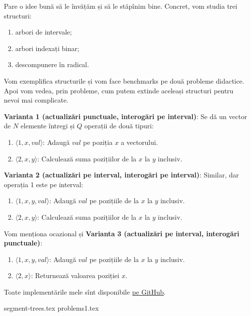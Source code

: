 Pare o idee bună să le învățăm și să le stăpînim bine.  Concret, vom studia trei structuri:

\begin{enumerate}
  \item arbori de intervale;
  \item arbori indexați binar;
  \item descompunere în radical.
\end{enumerate}

Vom exemplifica structurile și vom face benchmarks pe două probleme didactice. Apoi vom vedea, prin probleme, cum putem extinde aceleași structuri pentru nevoi mai complicate.

\textbf{Varianta 1 (actualizări punctuale, interogări pe interval)}: Se dă un vector de $N$ elemente întregi și $Q$ operații de două tipuri:

\begin{enumerate}
  \item $\langle 1, x, val \rangle$: Adaugă $val$ pe poziția $x$ a vectorului.
  \item $\langle 2, x, y \rangle$: Calculează suma pozițiilor de la $x$ la $y$ inclusiv.
\end{enumerate}

\textbf{Varianta 2 (actualizări pe interval, interogări pe interval)}: Similar, dar operația 1 este pe interval:

\begin{enumerate}
  \item $\langle 1, x, y, val \rangle$: Adaugă $val$ pe pozițiile de la $x$ la $y$ inclusiv.
  \item $\langle 2, x, y \rangle$: Calculează suma pozițiilor de la $x$ la $y$ inclusiv.
\end{enumerate}

Vom menționa ocazional și \textbf{Varianta 3 (actualizări pe interval, interogări punctuale)}:

\begin{enumerate}
  \item $\langle 1, x, y, val \rangle$: Adaugă $val$ pe pozițiile de la $x$ la $y$ inclusiv.
  \item $\langle 2, x \rangle$: Returnează valoarea poziției $x$.
\end{enumerate}

Toate implementările mele sînt disponibile \href{https://github.com/CatalinFrancu/nerdvana/tree/main/query-update}{pe GitHub}.

\begin{refsection}
  {segment-trees.tex}
  {problems1.tex}

  \nocite{cpa-segtree}
  \nocite{csa-segtree}
  \printbibliography
\end{refsection}
